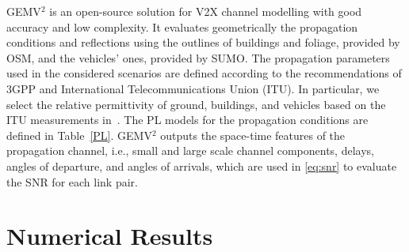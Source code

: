 \documentclass[journal]{IEEEtran}
\begin{document}
GEMV$^2$ \cite{GEMV2} is an open-source solution for V2X channel modelling with good accuracy and low complexity. It evaluates geometrically the propagation conditions and reflections using the outlines of buildings and foliage, provided by OSM, and the vehicles' ones, provided by SUMO. 
The propagation parameters used in the considered scenarios are defined according to the recommendations of 3GPP and International Telecommunications Union (ITU). In particular, we select the relative permittivity of ground, buildings, and vehicles based on the ITU measurements in~\cite{ITU-R2040}. The PL models for the propagation conditions are defined in Table~\ref{PL}.
GEMV$^{2}$ outputs the space-time features of the propagation channel, i.e., small and large scale channel components, delays, angles of departure, and angles of arrivals, which are used in \eqref{eq:snr} to evaluate the SNR for each link pair.


\section{Numerical Results} \label{sec:results}
\end{document}
